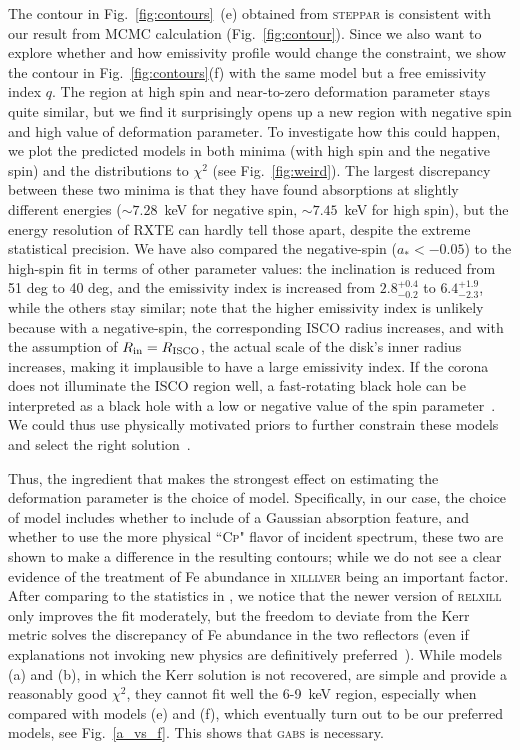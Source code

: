 \documentclass[11pt,a4paper,pdftex]{article}
\begin{document}
The contour in Fig.~\ref{fig:contours}~(e) obtained from \textsc{steppar} is consistent with our result from MCMC calculation (Fig.~\ref{fig:contour}). Since we also want to explore whether and how emissivity profile would change the constraint, we show the contour in Fig.~\ref{fig:contours}(f) with the same model but a free emissivity index $q$. The region at high spin and near-to-zero deformation parameter stays quite similar, but we find it surprisingly opens up a new region with negative spin and high value of deformation parameter. To investigate how this could happen, we plot the predicted models in both minima (with high spin and the negative spin) and the distributions to $\chi^2$ (see Fig.~\ref{fig:weird}). The largest discrepancy between these two minima is that they have found absorptions at slightly different energies ($\sim7.28$~keV for negative spin, $\sim 7.45$~keV for high spin), but the energy resolution of RXTE can hardly tell those apart, despite the extreme statistical precision. We have also compared the negative-spin ($a_*<-0.05$) to the high-spin fit in terms of other parameter values: the inclination is reduced from 51 deg to 40 deg, and the emissivity index is increased from $2.8^{+0.4}_{-0.2}$ to $6.4^{+1.9}_{-2.3}$, while the others stay similar; note that the higher emissivity index is unlikely because with a negative-spin, the corresponding ISCO radius increases, and with the assumption of $R_{\rm in}=R_{\rm ISCO}$, the actual scale of the disk's inner radius increases, making it implausible to have a large emissivity index. If the corona does not illuminate the ISCO region well, a fast-rotating black hole can be interpreted as a black hole with a low or negative value of the spin parameter~\cite{Fabian:2014tda}. We could thus use physically motivated priors to further constrain these models and select the right solution~\cite{Wilkins:2012zm,Fabian:2012kv,lamppost}.


Thus, the ingredient that makes the strongest effect on estimating the deformation parameter is the choice of model. Specifically, in our case, the choice of model includes whether to include of a Gaussian absorption feature, and whether to use the more physical ``\textsc{Cp}" flavor of incident spectrum, these two are shown to make a difference in the resulting contours; while we do not see a clear evidence of the treatment of Fe abundance in \textsc{xilllver} being an important factor. After comparing to the statistics in \cite{javier_gx339}, we notice that the newer version of \textsc{relxill} only improves the fit moderately, but the freedom to deviate from the Kerr metric solves the discrepancy of Fe abundance in the two reflectors (even if explanations not invoking new physics are definitively preferred~\cite{Jiang:2019xqn}). While models (a) and (b), in which the Kerr solution is not recovered, are simple and provide a reasonably good $\chi^2$, they cannot fit well the 6-9~keV region, especially when compared with models (e) and (f), which eventually turn out to be our preferred models, see Fig.~\ref{a_vs_f}. This shows that \textsc{gabs} is necessary.
\end{document}
